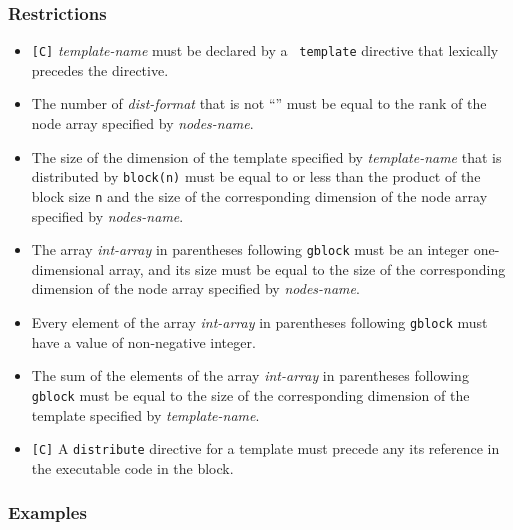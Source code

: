 \subsubsection*{Restrictions}

\begin{itemize}
 \item \verb![C]! {\it template-name} must be declared by a {\tt
       template} directive that lexically precedes the directive.
 \item The number of {\it dist-format} that is not ``{\tt *}'' must be
       equal to the rank of the node array specified by {\it nodes-name}.  
 \item The size of the dimension of the template specified by {\it
       template-name} that is distributed by {\tt block(n)} must be
       equal to or less than the product of the block size {\tt n} and
       the size of the corresponding dimension of the node array
       specified by {\it nodes-name}.
 \item The array {\it int-array} in parentheses following {\tt gblock}
       must be an integer one-dimensional array, and its size must be
       equal to the size of the corresponding dimension of the node array
       specified by {\it nodes-name}.
 \item Every element of the array {\it int-array} in parentheses
       following {\tt gblock} must have a value of non-negative integer.
 \item The sum of the elements of the array {\it int-array} in 
       parentheses following {\tt gblock} must be equal to the size of
       the corresponding dimension of the template specified by {\it
       template-name}.
 \item \verb![C]! A {\tt distribute} directive for a template must
       precede any its reference in the executable code in the block.
\end{itemize}

\subsubsection*{Examples}

